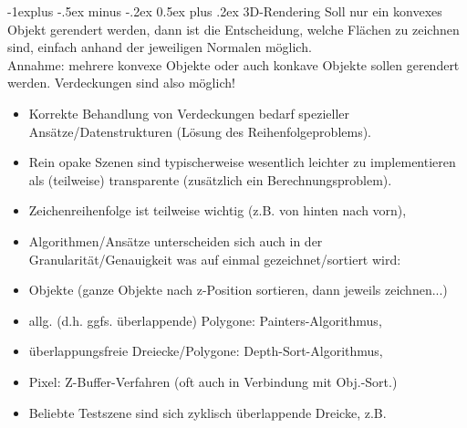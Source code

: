 \documentclass[10pt,landscape]{article}
\makeatletter
\renewcommand{\subsection}{\@startsection{subsection}{2}{0mm}%
                                {-1explus -.5ex minus -.2ex}%
                                {0.5ex plus .2ex}%
                                {\normalfont\normalsize\bfseries}}
\makeatother
\begin{document}
\begin{multicols}{3}
{  
  \subsection{ 3D-Rendering}
  Soll nur ein konvexes Objekt gerendert werden, dann ist die Entscheidung, welche Flächen zu zeichnen sind, einfach anhand der jeweiligen Normalen möglich.\\
  Annahme: mehrere konvexe Objekte oder auch konkave Objekte sollen gerendert werden. Verdeckungen sind also möglich!
  \begin{itemize}
    \item Korrekte Behandlung von Verdeckungen bedarf spezieller Ansätze/Datenstrukturen (Lösung des Reihenfolgeproblems).
    \item Rein opake Szenen sind typischerweise wesentlich leichter zu implementieren als (teilweise) transparente (zusätzlich ein Berechnungsproblem).
    \item Zeichenreihenfolge ist teilweise wichtig (z.B. von hinten nach vorn),
    \item Algorithmen/Ansätze unterscheiden sich auch in der Granularität/Genauigkeit was auf einmal gezeichnet/sortiert wird:
    \item Objekte (ganze Objekte nach z-Position sortieren, dann jeweils zeichnen...)
    \item allg. (d.h. ggfs. überlappende) Polygone: Painters-Algorithmus,
    \item überlappungsfreie Dreiecke/Polygone: Depth-Sort-Algorithmus,
    \item Pixel: Z-Buffer-Verfahren (oft auch in Verbindung mit Obj.-Sort.)
    \item Beliebte Testszene sind sich zyklisch überlappende Dreicke, z.B.
  \end{itemize}
  
}
\end{multicols}
\end{document}
